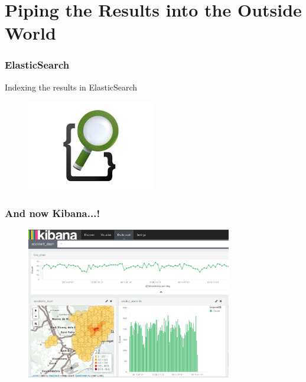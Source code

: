 \documentclass[hyperref={pdfpagelabels=true}]{beamer}
\begin{document}
\section{Piping the Results into the Outside World} 

\begin{frame}
\frametitle{ElasticSearch}
\huge{
Indexing the results in ElasticSearch
}
      \begin{figure}  
	\includegraphics[width=0.5\textwidth]{es.jpeg}	
       \end{figure}  
\end{frame}

\begin{frame}
\frametitle{And now Kibana...!}
      \begin{figure}  
	\includegraphics[width=0.8\textwidth]{screenshot.png}	
       \end{figure}  
\end{frame}

\end{document}
